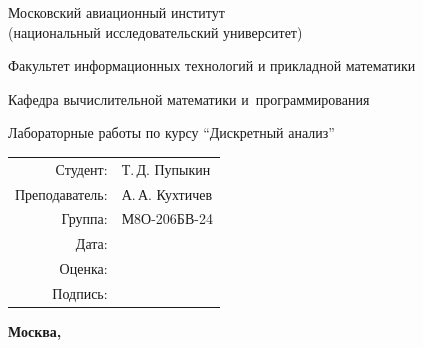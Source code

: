 \begin{titlepage}
\begin{center}
\bfseries

{\Large Московский авиационный институт\\ (национальный исследовательский университет)

}

\vspace{48pt}

{\large Факультет информационных технологий и прикладной математики
}

\vspace{36pt}

{\large Кафедра вычислительной математики и~программирования

}


\vspace{48pt}

Лабораторные работы  по курсу \enquote{Дискретный анализ}

\end{center}

\vspace{72pt}

\begin{flushright}
\begin{tabular}{rl}
Студент: & Т.\,Д. Пупыкин \\
Преподаватель: & А.\,А. Кухтичев \\
Группа: & М8О-206БВ-24 \\
Дата: & \\
Оценка: & \\
Подпись: & \\
\end{tabular}
\end{flushright}

\vfill

\begin{center}
\bfseries
Москва, \the\year
\end{center}
\end{titlepage}

\pagebreak